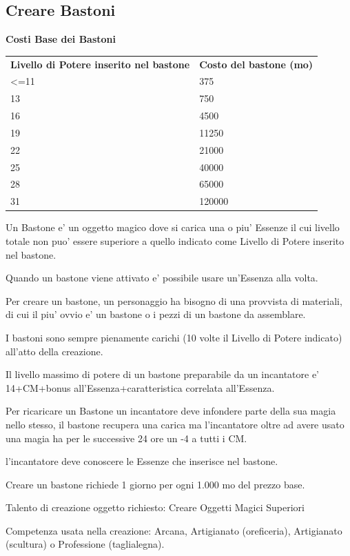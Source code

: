 \documentclass[a4paper,11pt,twoside,openany]{book}
\begin{document}
{		\subsection{Creare Bastoni}
		
		\textbf{Costi Base dei Bastoni}
		
		\bigskip
		
		\begin{tabular}{ll}
			\toprule
			\textbf{Livello di Potere inserito nel bastone} & \textbf{Costo del bastone (mo)}\tabularnewline
			\textless=11 & 375\tabularnewline
			13 & 750\tabularnewline
			16 & 4500\tabularnewline
			19 & 11250\tabularnewline
			22 & 21000\tabularnewline
			25 & 40000\tabularnewline
			28 & 65000\tabularnewline
			31 & 120000\tabularnewline
		\end{tabular}
		
		\bigskip
		
		Un Bastone e' un oggetto magico dove si carica una o piu' Essenze il cui livello totale non puo' essere superiore a quello indicato come Livello di Potere inserito nel bastone.
		
		Quando un bastone viene attivato e' possibile usare un'Essenza alla volta.
		
		Per creare un bastone, un personaggio ha bisogno di una provvista di materiali, di cui il piu' ovvio e' un bastone o i pezzi di un bastone da assemblare.
		
		I bastoni sono sempre pienamente carichi (10 volte il Livello di Potere indicato) all'atto della creazione.
		
		Il livello massimo di potere di un bastone preparabile da un incantatore e' 14+CM+bonus all'Essenza+caratteristica correlata all'Essenza. 
		
		Per ricaricare un Bastone un incantatore deve infondere parte della sua magia nello stesso, il bastone recupera una carica ma l'incantatore oltre ad avere usato una magia ha per le successive 24 ore un -4 a tutti i CM.
		
		l'incantatore deve conoscere le Essenze che inserisce nel bastone.
		
		Creare un bastone richiede 1 giorno per ogni 1.000 mo del prezzo base.
		
		Talento di creazione oggetto richiesto: Creare Oggetti Magici Superiori
		
		Competenza usata nella creazione: Arcana, Artigianato (oreficeria), Artigianato (scultura) o Professione (taglialegna).
		
}
\end{document}
